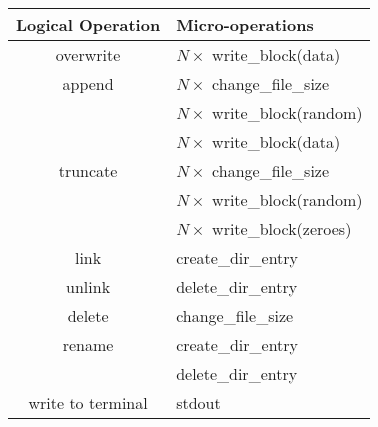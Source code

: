 \begin{table}[!t]
\begin{center}
{\footnotesize
\begin{tabular}{c|l}
\textbf{Logical Operation} & \textbf{Micro-operations} \\
\hline
overwrite &     $N \times$ write\_block(data) \\
\hline
append  &       $N \times$ change\_file\_size \\
        &       $N \times$ write\_block(random) \\
        &       $N \times$ write\_block(data) \\
\hline
truncate &      $N \times$ change\_file\_size \\
        &       $N \times$ write\_block(random) \\
        &       $N \times$ write\_block(zeroes) \\
\hline
link    &       create\_dir\_entry \\
\hline
unlink  &       delete\_dir\_entry \\
\hline
delete  &       change\_file\_size \\
\hline
rename &        create\_dir\_entry \\
       &        delete\_dir\_entry \\
\hline
write to terminal & stdout \\
\end{tabular}
}
\end{center}
\vspace{-0.1in}
\end{table}
